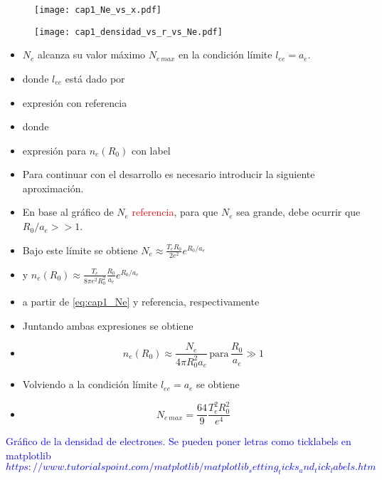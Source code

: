 \documentclass[aps,prb,onecolumn,superscriptaddress,floatfix,longbibliography,10pt]{revtex4-2}
\newif\ifptitle
\newif\ifpnumber
\newcounter{para}
\newcommand\ptitle[1]{\par\refstepcounter{para}
{\ifpnumber{\noindent\textcolor{lightgray}{\textbf{\thepara}}\indent}\fi}
{\ifptitle{\textbf{[{#1}]}}\fi}}
\begin{document}
\begin{figure}[h]
  \texttt{[image: cap1\_Ne\_vs\_x.pdf]}
  \caption{}
    \label{fig:cap1_Ne_vs_x}
\end{figure}

\begin{figure}[h]
  \texttt{[image: cap1\_densidad\_vs\_r\_vs\_Ne.pdf]}
  \caption{}
   \label{fig:cap1_densidad_vs_r_vs_Ne}
\end{figure}


\ptitle{Cálculo de $N_{e \, max}$}
\begin{itemize}
  \item $N_e$ alcanza su valor máximo $N_{e \, max}$ en la condición límite $l_{ee} = a_e$.
  \item donde $l_{ee}$ está dado por
  \item expresión con referencia
  \item donde
  \item expresión para $n_e(R_0)$ con label
  \item Para continuar con el desarrollo es necesario introducir la siguiente aproximación.
  \item En base al gráfico de $N_e$ \textcolor{red}{referencia}, para que $N_e$ sea grande, debe ocurrir que $R_0/a_e>>1$.
  \item Bajo este límite se obtiene $N_e \approx \frac{T_e R_0}{2 e^2} e^{R_0/a_e}$
  \item y $n_e(R_0) \approx \frac{T_e}{8 \pi e^2 R_0^2} \frac{R_0}{a_e} e^{R_0/a_e}$
  \item a partir de \ref{eq:cap1_Ne} y referencia, respectivamente
  \item Juntando ambas expresiones se obtiene
  \item \[n_e(R_0) \approx \frac{N_e}{4 \pi R_0^2 a_e} \, \mathrm{para } \, \frac{R_0}{a_e} \gg 1 \]
  \item Volviendo a la condición límite $l_{ee} = a_e$ se obtiene
  \item 
  \begin{equation}
    N_{e \, max} = \frac{64}{9} \frac{T_e^2 R_0^2}{e^4}
    \label{eq:cap1_Nemax_R0}
  \end{equation}
\end{itemize}

\textcolor{blue}{Gráfico de la densidad de electrones. Se pueden poner letras como ticklabels en matplotlib $https://www.tutorialspoint.com/matplotlib/matplotlib_setting_ticks_and_tick_labels.htm$}
\end{document}
